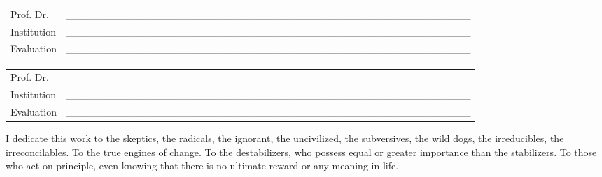 \begin{folhadeaprovacao}
  \vspace*{0.5cm}

  \noindent
  \begin{tabular}{m{2cm} P{14cm}}
    Prof. Dr. & \_\_\_\_\_\_\_\_\_\_\_\_\_\_\_\_\_\_\_\_\_\_\_\_\_\_\_\_\_\_\_\_\_\_\_\_\_\_\_\_\_\_\_\_\_\_\_\_\_\_\_\_\_\_\_ \\
    Institution & \_\_\_\_\_\_\_\_\_\_\_\_\_\_\_\_\_\_\_\_\_\_\_\_\_\_\_\_\_\_\_\_\_\_\_\_\_\_\_\_\_\_\_\_\_\_\_\_\_\_\_\_\_\_\_ \\
    Evaluation & \_\_\_\_\_\_\_\_\_\_\_\_\_\_\_\_\_\_\_\_\_\_\_\_\_\_\_\_\_\_\_\_\_\_\_\_\_\_\_\_\_\_\_\_\_\_\_\_\_\_\_\_\_\_\_ \\
  \end{tabular}

  \vspace*{0.5cm}

  \noindent
  \begin{tabular}{m{2cm} P{14cm}}
    Prof. Dr. & \_\_\_\_\_\_\_\_\_\_\_\_\_\_\_\_\_\_\_\_\_\_\_\_\_\_\_\_\_\_\_\_\_\_\_\_\_\_\_\_\_\_\_\_\_\_\_\_\_\_\_\_\_\_\_ \\
    Institution & \_\_\_\_\_\_\_\_\_\_\_\_\_\_\_\_\_\_\_\_\_\_\_\_\_\_\_\_\_\_\_\_\_\_\_\_\_\_\_\_\_\_\_\_\_\_\_\_\_\_\_\_\_\_\_ \\
    Evaluation & \_\_\_\_\_\_\_\_\_\_\_\_\_\_\_\_\_\_\_\_\_\_\_\_\_\_\_\_\_\_\_\_\_\_\_\_\_\_\_\_\_\_\_\_\_\_\_\_\_\_\_\_\_\_\_ \\
  \end{tabular}
\end{folhadeaprovacao}


\begin{dedicatoria}
  \vspace*{\fill}
  \centering
I dedicate this work to the skeptics, the radicals, the ignorant, the
uncivilized, the subversives, the wild dogs, the irreducibles, the
irreconcilables. To the true engines of change. To the destabilizers,
who possess equal or greater importance than the stabilizers. To those
who act on principle, even knowing that there is no ultimate reward or
any meaning in life.
	\vspace*{\fill}
\end{dedicatoria}

